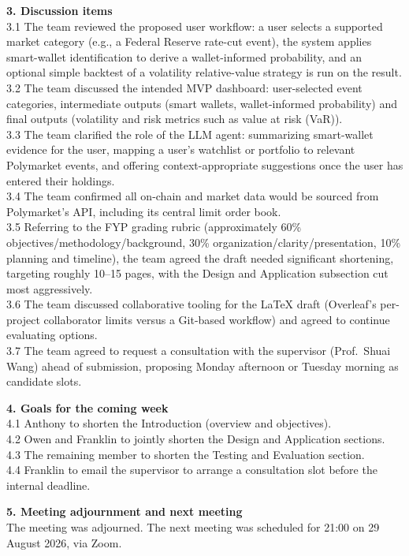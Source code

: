 \textbf{3. Discussion items} \\
3.1 The team reviewed the proposed user workflow: a user selects a supported market category (e.g., a Federal Reserve rate-cut event), the system applies smart-wallet identification to derive a wallet-informed probability, and an optional simple backtest of a volatility relative-value strategy is run on the result. \\
3.2 The team discussed the intended MVP dashboard: user-selected event categories, intermediate outputs (smart wallets, wallet-informed probability) and final outputs (volatility and risk metrics such as value at risk (VaR)). \\
3.3 The team clarified the role of the LLM agent: summarizing smart-wallet evidence for the user, mapping a user's watchlist or portfolio to relevant Polymarket events, and offering context-appropriate suggestions once the user has entered their holdings. \\
3.4 The team confirmed all on-chain and market data would be sourced from Polymarket's API, including its central limit order book. \\
3.5 Referring to the FYP grading rubric (approximately 60\% objectives/methodology/background, 30\% organization/clarity/presentation, 10\% planning and timeline), the team agreed the draft needed significant shortening, targeting roughly 10--15 pages, with the Design and Application subsection cut most aggressively. \\
3.6 The team discussed collaborative tooling for the LaTeX draft (Overleaf's per-project collaborator limits versus a Git-based workflow) and agreed to continue evaluating options. \\
3.7 The team agreed to request a consultation with the supervisor (Prof.\ Shuai Wang) ahead of submission, proposing Monday afternoon or Tuesday morning as candidate slots.

\textbf{4. Goals for the coming week} \\
4.1 Anthony to shorten the Introduction (overview and objectives). \\
4.2 Owen and Franklin to jointly shorten the Design and Application sections. \\
4.3 The remaining member to shorten the Testing and Evaluation section. \\
4.4 Franklin to email the supervisor to arrange a consultation slot before the internal deadline.

\textbf{5. Meeting adjournment and next meeting} \\
The meeting was adjourned. The next meeting was scheduled for 21:00 on 29 August 2026, via Zoom.

